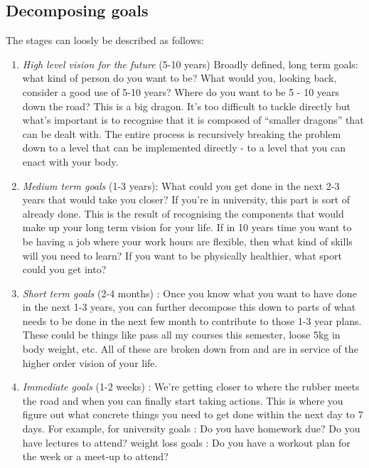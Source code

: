 \documentclass[10pt,twocolumn]{extarticle}
\begin{document}
\subsection{Decomposing goals}
\label{sec:decomposing}

The stages can loosly be described as follows:

\begin{enumerate}
    \item \textit{High level vision for the future} (5-10 years) Broadly defined, long term goals: what kind of person do you want to be? What would you, looking back, consider a good use of 5-10 years? Where do you want to be 5 - 10 years down the road? This is a big dragon. It’s too difficult to tackle directly but what’s important is to recognise that it is composed of ``smaller dragons” that can be dealt with. The entire process is recursively breaking the problem down to a level that can be implemented directly - to a level that you can enact with your body.
    \item \textit{Medium term goals} (1-3 years): What could you get done in the next 2-3 years that would take you closer? If you’re in university, this part is sort of already done. This is the result of recognising the components that would make up your long term vision for your life. If in 10 years time you want to be having a job where your work hours are flexible, then what kind of skills will you need to learn? If you want to be physically healthier, what sport could you get into?
    \item \textit{Short term goals} (2-4 months) :  Once you know what you want to have done in the next 1-3 years, you can further decompose this down to parts of what needs to be done in the next few month to contribute to those 1-3 year plans. These could be things like pass all my courses this semester, loose 5kg in body weight, etc. All of these are broken down from and are in service of the higher order vision of your life.
    \item \textit{Immediate goals} (1-2 weeks) : We’re getting closer to where the rubber meets the road and when you can finally start taking actions. This is where you figure out what concrete things you need to get done within the next day to 7 days. For example, for university goals : Do you have homework due? Do you have lectures to attend? weight loss goals : Do you have a workout plan for the week or
    a meet-up to attend?

\end{enumerate}
\end{document}

